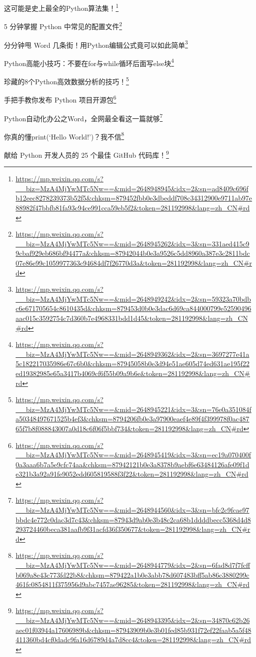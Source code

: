 \documentclass[]{ctexbook}
\renewcommand{\href}[2]{#2\footnote{\url{#1}}}
\begin{document}
\href{https://mp.weixin.qq.com/s?__biz=MzA4MjYwMTc5Nw==\&mid=2648948945\&idx=2\&sn=ad8409c696fb12eec8278239373b52f5\&chksm=879452fbb0e3dbeddf708c34312900e9711ab97e88982f47bbfb81fa93c94ce991cca59eb5f2\&token=281192998\&lang=zh_CN\#rd}{这可能是史上最全的Python算法集！}

\href{https://mp.weixin.qq.com/s?__biz=MzA4MjYwMTc5Nw==\&mid=2648945262\&idx=3\&sn=331aed415c99cbaf929eb686bf94477a\&chksm=87942044b0e3a9526c5dd8960a387e3c2811bdc07e86e99c1059977363c94684df7f26770d3a\&token=281192998\&lang=zh_CN\#rd}{5 分钟掌握 Python 中常见的配置文件}

\href{https://mp.weixin.qq.com/s?__biz=MzA4MjYwMTc5Nw==\&mid=2648949242\&idx=2\&sn=59323a70bdbc6e671705654c8610435d\&chksm=879453d0b0e3dac6d69ca844000799e52590496aac015c3592754c7d360b7e4968331bdd1d45\&token=281192998\&lang=zh_CN\#rd}{分分钟甩 Word 几条街！用Python编辑公式竟可以如此简单}

\href{https://mp.weixin.qq.com/s?__biz=MzA4MjYwMTc5Nw==\&mid=2648949362\&idx=2\&sn=3697277e41a5c182217035986e67c6b0\&chksm=87945058b0e3d94e51ae605d74ed631ae195f22ed19382985e65a3417b4069cf6f55b09a9b6e\&token=281192998\&lang=zh_CN\#rd}{Python高能小技巧：不要在for与while循环后面写else块}

\href{https://mp.weixin.qq.com/s?__biz=MzA4MjYwMTc5Nw==\&mid=2648945221\&idx=3\&sn=76e0a351084fa50348497671525b4ef3\&chksm=8794206fb0e3a97900eaef4e89f4f399978f0ac48765f7b8f088843007a0d18c6f06f5bbf734\&token=281192998\&lang=zh_CN\#rd}{珍藏的8个Python高效数据分析的技巧！}

\href{https://mp.weixin.qq.com/s?__biz=MzA4MjYwMTc5Nw==\&mid=2648945419\&idx=3\&sn=ec19a070400f0a3aaa6b7a5e9cfc74aa\&chksm=87942121b0e3a8378b9aebf6e63484126afe09f1de321b3a92a91fe9052edd605819588f3f22\&token=281192998\&lang=zh_CN\#rd}{手把手教你发布 Python 项目开源包}

\href{https://mp.weixin.qq.com/s?__biz=MzA4MjYwMTc5Nw==\&mid=2648944560\&idx=3\&sn=bfc2c9fcae97bbdc4e772c0dac3d7c43\&chksm=87943d9ab0e3b48c2ca68b1ddddbecc5368d4d8293724460beca381aafb9f31acfd36f350677\&token=281192998\&lang=zh_CN\#rd}{Python自动化办公之Word，全网最全看这一篇就够}

\href{https://mp.weixin.qq.com/s?__biz=MzA4MjYwMTc5Nw==\&mid=2648944779\&idx=2\&sn=6fad8d7f7fcffb069a8e43c773fd22b8\&chksm=879422a1b0e3abb78d607483bff5ab86c3880299c461fc0854811f375956d9abc7457ae96285\&token=281192998\&lang=zh_CN\#rd}{你真的懂print(`Hello World!')？我不信}

\href{https://mp.weixin.qq.com/s?__biz=MzA4MjYwMTc5Nw==\&mid=2648943395\&idx=2\&sn=34870c62b26aec01f03944a17606989b\&chksm=87943909b0e3b01fed85b931f72ef22faab5a5f48411360bd4cf0dadc9fa16d6789d4a7d8cc4\&token=281192998\&lang=zh_CN\#rd}{献给 Python 开发人员的 25 个最佳 GitHub 代码库！}
\end{document}
